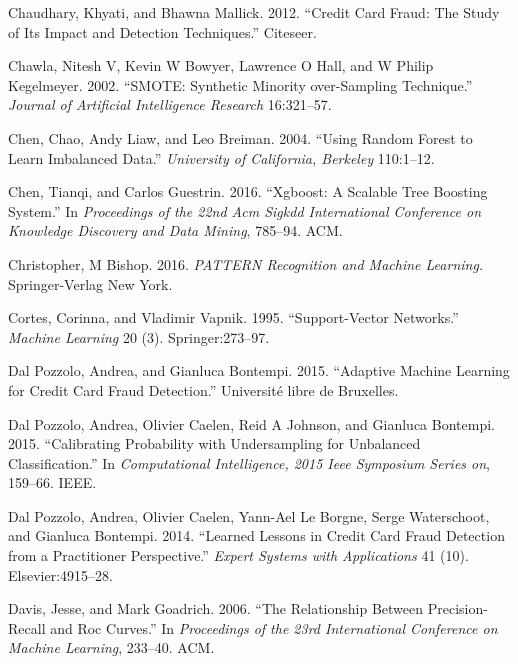 \documentclass[12pt,]{article}
\begin{document}
\leavevmode\hypertarget{ref-chaudhary2012credit}{}%
Chaudhary, Khyati, and Bhawna Mallick. 2012. ``Credit Card Fraud: The
Study of Its Impact and Detection Techniques.'' Citeseer.

\leavevmode\hypertarget{ref-chawla2002smote}{}%
Chawla, Nitesh V, Kevin W Bowyer, Lawrence O Hall, and W Philip
Kegelmeyer. 2002. ``SMOTE: Synthetic Minority over-Sampling Technique.''
\emph{Journal of Artificial Intelligence Research} 16:321--57.

\leavevmode\hypertarget{ref-chen2004using}{}%
Chen, Chao, Andy Liaw, and Leo Breiman. 2004. ``Using Random Forest to
Learn Imbalanced Data.'' \emph{University of California, Berkeley}
110:1--12.

\leavevmode\hypertarget{ref-chen2016xgboost}{}%
Chen, Tianqi, and Carlos Guestrin. 2016. ``Xgboost: A Scalable Tree
Boosting System.'' In \emph{Proceedings of the 22nd Acm Sigkdd
International Conference on Knowledge Discovery and Data Mining},
785--94. ACM.

\leavevmode\hypertarget{ref-christopher2016pattern}{}%
Christopher, M Bishop. 2016. \emph{PATTERN Recognition and Machine
Learning.} Springer-Verlag New York.

\leavevmode\hypertarget{ref-cortes1995support}{}%
Cortes, Corinna, and Vladimir Vapnik. 1995. ``Support-Vector Networks.''
\emph{Machine Learning} 20 (3). Springer:273--97.

\leavevmode\hypertarget{ref-dal2015adaptive}{}%
Dal Pozzolo, Andrea, and Gianluca Bontempi. 2015. ``Adaptive Machine
Learning for Credit Card Fraud Detection.'' Université libre de
Bruxelles.

\leavevmode\hypertarget{ref-dal2015calibrating}{}%
Dal Pozzolo, Andrea, Olivier Caelen, Reid A Johnson, and Gianluca
Bontempi. 2015. ``Calibrating Probability with Undersampling for
Unbalanced Classification.'' In \emph{Computational Intelligence, 2015
Ieee Symposium Series on}, 159--66. IEEE.

\leavevmode\hypertarget{ref-dal2014learned}{}%
Dal Pozzolo, Andrea, Olivier Caelen, Yann-Ael Le Borgne, Serge
Waterschoot, and Gianluca Bontempi. 2014. ``Learned Lessons in Credit
Card Fraud Detection from a Practitioner Perspective.'' \emph{Expert
Systems with Applications} 41 (10). Elsevier:4915--28.

\leavevmode\hypertarget{ref-davis2006relationship}{}%
Davis, Jesse, and Mark Goadrich. 2006. ``The Relationship Between
Precision-Recall and Roc Curves.'' In \emph{Proceedings of the 23rd
International Conference on Machine Learning}, 233--40. ACM.
\end{document}

